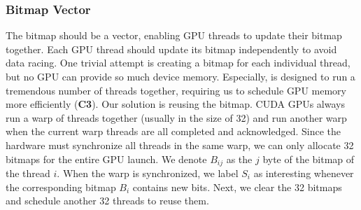 


\subsubsection{Bitmap Vector}
\label{sec:translator:bitmap}

The bitmap should be a vector, enabling GPU threads to update their bitmap together.
Each GPU thread should update its bitmap independently to avoid data racing. One trivial attempt is creating a bitmap for each individual thread, but no GPU can provide so much device memory.
Especially, {\tool} is designed to run a tremendous number of threads together, requiring us to schedule GPU memory more efficiently (\textbf{C3}). 
Our solution is reusing the bitmap.
CUDA GPUs always run a warp of threads together (usually in the size of 32) and run another warp when the current warp threads are all completed and acknowledged\cite{nvidia2021cuda}. Since the hardware must synchronize all threads in the same warp, we can only allocate 32 bitmaps for the entire GPU launch. 
We denote $B_{ij}$ as the $j$ byte of the bitmap of the thread $i$.
When the warp is synchronized, we label $S_i$ as interesting whenever the corresponding bitmap $B_i$ contains new bits. 
Next, we clear the 32 bitmaps and schedule another 32 threads to reuse them.
%


